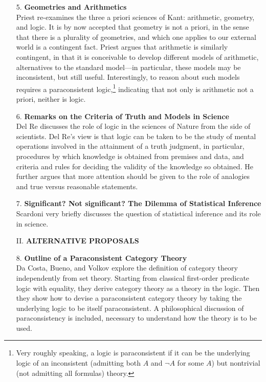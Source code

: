 \documentclass[11pt]{article}
\newcommand{\<}{\langle}
\renewcommand{\>}{\rangle}
\begin{document}
\begin{itemize}
\item[5.] \textbf{Geometries and Arithmetics}\\
Priest re-examines the three a
priori sciences of Kant: arithmetic, geometry, and logic. 
It is by now accepted that geometry is not a priori, in the sense that
there is a plurality of geometries, and which one applies to our
external world is a contingent fact. 
Priest argues that arithmetic is similarly contingent, in that it is
conceivable to develop different models of arithmetic, alternatives to
the standard model---in particular, these models may be inconsistent,
but still useful. 
Interestingly, to reason about such models requires a paraconsistent
logic,\footnote{Very roughly speaking, a logic is paraconsistent if it
can be the underlying logic of an inconsistent (admitting both $A$
and $\neg A$ for some $A$) but nontrivial (not admitting all
formulas) theory.}
indicating that not only is arithmetic not a priori, neither is
logic. 

\item[6.] \textbf{Remarks on the Criteria of Truth and Models in
Science}\\ 
Del Re discusses the role of logic in the sciences of
Nature from the side of scientists. Del Re's view is that logic can be
taken to be the study of mental operations involved in the attainment
of a truth judgment, in particular, procedures by which knowledge is
obtained from premises and data, and criteria and rules for deciding
the validity of the knowledge so obtained. 
He further argues that more attention should be given to the role of
analogies and true versus reasonable statements. 

\item[7.] \textbf{Significant? Not significant? The Dilemma of Statistical
Inference}\\
Scardoni very briefly discusses  the question of
statistical inference and its role in science.

\item[II.] \textbf{ALTERNATIVE PROPOSALS}

\item[8.] \textbf{Outline of a Paraconsistent Category Theory}\\ Da
Costa, Bueno, and Volkov explore the definition of category theory
independently from set theory.
Starting from classical first-order predicate logic with
equality, they derive category theory as a theory in the logic. 
Then they show how to devise a paraconsistent category theory by
taking the underlying logic to be itself paraconsistent. 
A philosophical discussion of paraconsistency is included, necessary
to understand how the theory is to be used.


\end{itemize}
\end{document}
